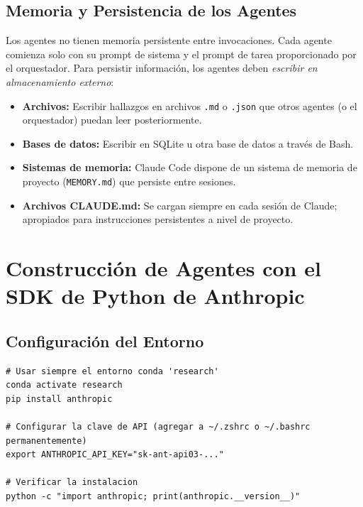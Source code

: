 \documentclass[11pt,letterpaper]{article}
\begin{document}
\subsection{Memoria y Persistencia de los Agentes}

Los agentes no tienen memoria persistente entre invocaciones. Cada agente comienza solo con su prompt de sistema y el prompt de tarea proporcionado por el orquestador. Para persistir información, los agentes deben \emph{escribir en almacenamiento externo}:

\begin{itemize}[leftmargin=*]
    \item \textbf{Archivos:} Escribir hallazgos en archivos \texttt{.md} o \texttt{.json} que otros agentes (o el orquestador) puedan leer posteriormente.
    \item \textbf{Bases de datos:} Escribir en SQLite u otra base de datos a través de Bash.
    \item \textbf{Sistemas de memoria:} Claude Code dispone de un sistema de memoria de proyecto (\texttt{MEMORY.md}) que persiste entre sesiones.
    \item \textbf{Archivos CLAUDE.md:} Se cargan siempre en cada sesión de Claude; apropiados para instrucciones persistentes a nivel de proyecto.
\end{itemize}

\section{Construcción de Agentes con el SDK de Python de Anthropic}

\subsection{Configuración del Entorno}

\begin{lstlisting}[style=BashStyle, caption={Configuración del entorno (conda, según se requiere)}]
# Usar siempre el entorno conda 'research'
conda activate research
pip install anthropic

# Configurar la clave de API (agregar a ~/.zshrc o ~/.bashrc permanentemente)
export ANTHROPIC_API_KEY="sk-ant-api03-..."

# Verificar la instalacion
python -c "import anthropic; print(anthropic.__version__)"
\end{lstlisting}
\end{document}
